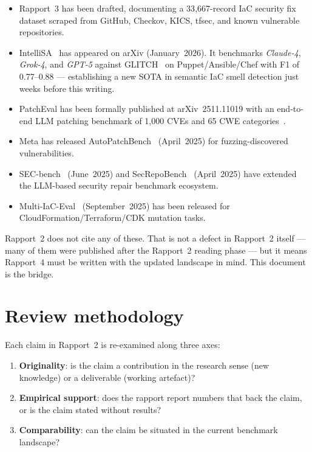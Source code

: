 \documentclass[11pt, a4paper]{report}
\begin{document}
\begin{itemize}
  \item Rapport~3 has been drafted, documenting a 33{,}667-record IaC security
        fix dataset scraped from GitHub, Checkov, KICS, tfsec, and known
        vulnerable repositories.
  \item IntelliSA~\citep{intellisa2026} has appeared on arXiv (January~2026).
        It benchmarks \emph{Claude-4}, \emph{Grok-4}, and \emph{GPT-5} against
        GLITCH~\citep{saavedra2022glitch} on Puppet/Ansible/Chef with
        F1 of 0.77--0.88 --- establishing a new SOTA in semantic IaC smell
        detection just weeks before this writing.
  \item PatchEval has been formally published at arXiv~2511.11019 with an
        end-to-end LLM patching benchmark of 1{,}000 CVEs and 65 CWE
        categories~\citep{lyu2024patcheval}.
  \item Meta has released AutoPatchBench~\citep{autopatchbench2025}
        (April~2025) for fuzzing-discovered vulnerabilities.
  \item SEC-bench~\citep{secbench2025} (June~2025) and
        SecRepoBench~\citep{secrepobench2025} (April~2025) have extended the
        LLM-based security repair benchmark ecosystem.
  \item Multi-IaC-Eval~\citep{multi2025iaceval} (September~2025) has been
        released for CloudFormation/Terraform/CDK mutation tasks.
\end{itemize}

Rapport~2 does not cite any of these. That is not a defect in Rapport~2
itself --- many of them were published after the Rapport~2 reading phase ---
but it means Rapport~4 must be written with the updated landscape in mind.
This document is the bridge.

\section{Review methodology}

Each claim in Rapport~2 is re-examined along three axes:

\begin{enumerate}
  \item \textbf{Originality}: is the claim a contribution in the research
        sense (new knowledge) or a deliverable (working artefact)?
  \item \textbf{Empirical support}: does the rapport report numbers that
        back the claim, or is the claim stated without results?
  \item \textbf{Comparability}: can the claim be situated in the current
        benchmark landscape?
\end{enumerate}
\end{document}
